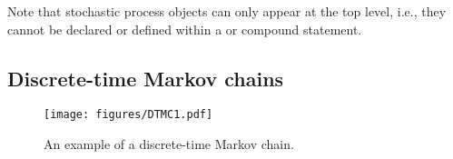 Note that stochastic process objects can only appear at the top level,
i.e., they cannot be declared or defined within a  or 
compound statement.



\begin{comment}
The most important characteristic of a model expressed in a given
formalism is whether it describes a discrete-time stochastic process
$\{X^{[k]} : k \in \Naturals\}$ or a continuous-time stochastic
process $\{X(t) : t \geq 0\}$.  In \smart , two classes of discrete-state Markov
processes are fundamental: discrete-time and continuous-time Markov chains.
In discrete-time Markov chains, the state of the model is observed at each
integer time, while, in continuous-time Markov chains, events occur at
any time, but the amount of time elapsing
between any two events is exponentially distributed.  Such models can
be combined in very natural ways, and are quite general, due to the
concept of {\em phase-type} distributions, which is applicable both to
the discrete and the continuous case.  In both discrete-time and
continuous-time models, the timing of events can have a mass at zero
(immediate events) or at infinity (non-occurring events).
The underlying discrete-time Markov chains and continuous-time Markov chains
can be solved numerically for steady-state or transient analysis.
Alternatively, discrete-event simulation can
be employed for the solution.

However, a model containing both discrete timing (other than zero or
infinity) and continuous timing, defines an underlying process which
can be independent semi-Markovian, semi-Markovian,
semi-regenerative, or generalized semi-Markovian.  The numerical
solution of these processes is sometimes possible depending, among
other factors, on whether a transient or steady-state solution is
desired.  Alternatively, discrete-event simulation is often the method
of choice in these cases, especially for transient analysis.
\begin{release}
Currently, {\smart} does not support discrete-event simulation.
\end{release}
\end{comment}


\subsection{Discrete-time Markov chains}

\begin{figure}  
  \centering
  \texttt{[image: figures/DTMC1.pdf]}
  \caption{An example of a discrete-time Markov chain.}
  \label{FIG:DTMC1}
\end{figure}

